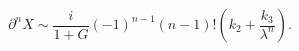 \begin{equation}
\partial ^{n}X\sim \frac{i}{1+G}(-1)^{n-1}(n-1)!(k_{2}+\frac{k_{3}}{\lambda
^{n}}).
\end{equation}%
